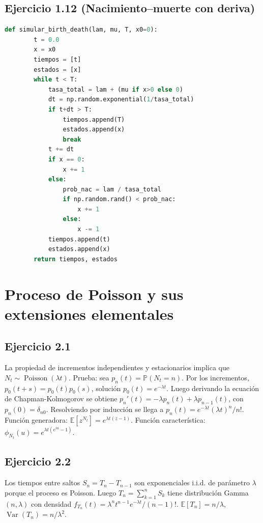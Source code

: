 \documentclass[letterpaper, 12pt]{article}
\newcommand{\E}{\mathbb{E}}
\renewcommand{\P}{\mathbb{P}}
\newcommand{\1}{\mathbbm{1}}
\DeclareMathOperator{\Var}{Var}
\DeclareMathOperator{\Poisson}{Poisson}
\begin{document}
    \subsection{Ejercicio 1.12 (Nacimiento--muerte con deriva)}
    \begin{lstlisting}[language=Python, caption=Simulaci\'on nacimiento-muerte]
    def simular_birth_death(lam, mu, T, x0=0):
        t = 0.0
        x = x0
        tiempos = [t]
        estados = [x]
        while t < T:
            tasa_total = lam + (mu if x>0 else 0)
            dt = np.random.exponential(1/tasa_total)
            if t+dt > T:
                tiempos.append(T)
                estados.append(x)
                break
            t += dt
            if x == 0:
                x += 1
            else:
                prob_nac = lam / tasa_total
                if np.random.rand() < prob_nac:
                    x += 1
                else:
                    x -= 1
            tiempos.append(t)
            estados.append(x)
        return tiempos, estados
    \end{lstlisting}

    \section{Proceso de Poisson y sus extensiones elementales}

    \subsection{Ejercicio 2.1}
    La propiedad de incrementos independientes y estacionarios implica que $N_t\sim\Poisson(\lambda t)$. Prueba: sea $p_n(t)=\P(N_t=n)$. Por los incrementos, $p_0(t+s)=p_0(t)p_0(s)$, soluci\'on $p_0(t)=e^{-\lambda t}$. Luego derivando la ecuaci\'on de Chapman-Kolmogorov se obtiene $p_n'(t)=-\lambda p_n(t)+\lambda p_{n-1}(t)$, con $p_n(0)=\delta_{n0}$. Resolviendo por inducci\'on se llega a $p_n(t)=e^{-\lambda t}(\lambda t)^n/n!$. Funci\'on generadora: $\E[z^{N_t}]=e^{\lambda t(z-1)}$. Funci\'on caracter\'istica: $\phi_{N_t}(u)=e^{\lambda t(e^{iu}-1)}$.

    \subsection{Ejercicio 2.2}
    Los tiempos entre saltos $S_n=T_n-T_{n-1}$ son exponenciales i.i.d. de par\'ametro $\lambda$ porque el proceso es Poisson. Luego $T_n=\sum_{k=1}^n S_k$ tiene distribuci\'on Gamma$(n,\lambda)$ con densidad $f_{T_n}(t)=\lambda^n t^{n-1}e^{-\lambda t}/(n-1)!$. $\E[T_n]=n/\lambda$, $\Var(T_n)=n/\lambda^2$.
\end{document}
